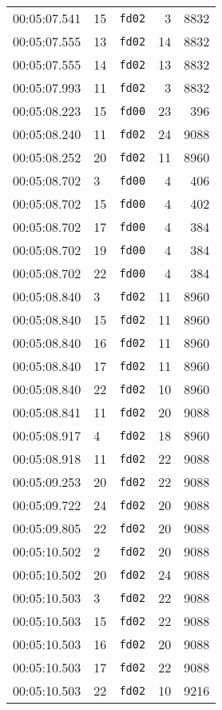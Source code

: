 \documentclass{article}
\begin{document}
\begin{longtable}{lllrr}
00:05:07.541 & 15 & \texttt{fd02} & 3 & 8832 \\
00:05:07.555 & 13 & \texttt{fd02} & 14 & 8832 \\
00:05:07.555 & 14 & \texttt{fd02} & 13 & 8832 \\
00:05:07.993 & 11 & \texttt{fd02} & 3 & 8832 \\
00:05:08.223 & 15 & \texttt{fd00} & 23 & 396 \\
00:05:08.240 & 11 & \texttt{fd02} & 24 & 9088 \\
00:05:08.252 & 20 & \texttt{fd02} & 11 & 8960 \\
00:05:08.702 & 3 & \texttt{fd00} & 4 & 406 \\
00:05:08.702 & 15 & \texttt{fd00} & 4 & 402 \\
00:05:08.702 & 17 & \texttt{fd00} & 4 & 384 \\
00:05:08.702 & 19 & \texttt{fd00} & 4 & 384 \\
00:05:08.702 & 22 & \texttt{fd00} & 4 & 384 \\
00:05:08.840 & 3 & \texttt{fd02} & 11 & 8960 \\
00:05:08.840 & 15 & \texttt{fd02} & 11 & 8960 \\
00:05:08.840 & 16 & \texttt{fd02} & 11 & 8960 \\
00:05:08.840 & 17 & \texttt{fd02} & 11 & 8960 \\
00:05:08.840 & 22 & \texttt{fd02} & 10 & 8960 \\
00:05:08.841 & 11 & \texttt{fd02} & 20 & 9088 \\
00:05:08.917 & 4 & \texttt{fd02} & 18 & 8960 \\
00:05:08.918 & 11 & \texttt{fd02} & 22 & 9088 \\
00:05:09.253 & 20 & \texttt{fd02} & 22 & 9088 \\
00:05:09.722 & 24 & \texttt{fd02} & 20 & 9088 \\
00:05:09.805 & 22 & \texttt{fd02} & 20 & 9088 \\
00:05:10.502 & 2 & \texttt{fd02} & 20 & 9088 \\
00:05:10.502 & 20 & \texttt{fd02} & 24 & 9088 \\
00:05:10.503 & 3 & \texttt{fd02} & 22 & 9088 \\
00:05:10.503 & 15 & \texttt{fd02} & 22 & 9088 \\
00:05:10.503 & 16 & \texttt{fd02} & 20 & 9088 \\
00:05:10.503 & 17 & \texttt{fd02} & 22 & 9088 \\
00:05:10.503 & 22 & \texttt{fd02} & 10 & 9216 \\

\end{longtable}
\end{document}
